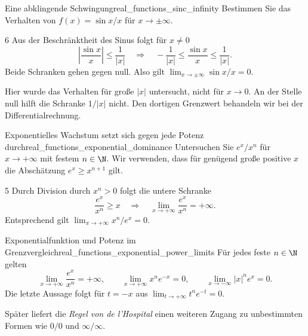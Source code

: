 \begin{ExampleBox}{Eine abklingende Schwingung}{real_functions_sinc_infinity}
  Bestimmen Sie das Verhalten von $f(x)=\sin x/x$ für $x\to\pm\infty$.
  \begin{ClozeArea}[34]{6}
    Aus der Beschränktheit des Sinus folgt für $x\ne0$
    \[
      \left|\frac{\sin x}{x}\right|\le\frac1{|x|}
      \quad\Longrightarrow\quad
      -\frac1{|x|}\le\frac{\sin x}{x}\le\frac1{|x|}.
    \]
    Beide Schranken gehen gegen null. Also gilt
    $\lim_{x\to\pm\infty}\sin x/x=0$.
  \end{ClozeArea}
  \begin{center}
  \end{center}
\end{ExampleBox}
\begin{RemarkBox}[remark title=Große Eingaben statt Annäherung an null]
  Hier wurde das Verhalten für große $|x|$ untersucht, nicht für $x\to0$.
  An der Stelle null hilft die Schranke $1/|x|$ nicht.
  Den dortigen Grenzwert behandeln wir bei der Differentialrechnung.
\end{RemarkBox}

\begin{ExampleBox}{Exponentielles Wachstum setzt sich gegen jede Potenz durch}{real_functions_exponential_dominance}
  Untersuchen Sie $e^x/x^n$ für $x\to+\infty$ mit festem $n\in\N$.
  Wir verwenden, dass für genügend große positive $x$ die Abschätzung
  $e^x\ge x^{n+1}$ gilt.
  \begin{ClozeArea}[34]{5}
    Durch Division durch $x^n>0$ folgt die untere Schranke
    \[
      \frac{e^x}{x^n}\ge x
      \quad\Longrightarrow\quad
      \lim_{x\to+\infty}\frac{e^x}{x^n}=+\infty.
    \]
    Entsprechend gilt $\lim_{x\to+\infty}x^n/e^x=0$.
  \end{ClozeArea}
  \begin{center}
  \end{center}
\end{ExampleBox}
\begin{KeyPointBox}{Exponentialfunktion und Potenz im Grenzvergleich}{real_functions_exponential_power_limits}
  Für jedes feste $n\in\N$ gelten
  \[
    \lim_{x\to+\infty}\frac{e^x}{x^n}=+\infty,\qquad
    \lim_{x\to+\infty}x^n e^{-x}=0,\qquad
    \lim_{x\to-\infty}|x|^n e^x=0.
  \]
  Die letzte Aussage folgt für $t=-x$ aus
  $\lim_{t\to+\infty}t^n e^{-t}=0$.
\end{KeyPointBox}
Später liefert die \emph{Regel von de l'Hospital}
 einen weiteren Zugang zu unbestimmten
Formen wie $0/0$ und $\infty/\infty$.

